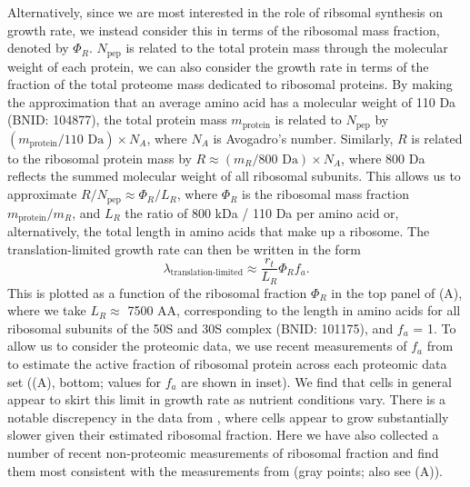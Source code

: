Alternatively, since we are most interested in the role of ribsomal synthesis on
growth rate, we instead consider this in terms of the ribosomal mass fraction, denoted by $\Phi_R$. $N_\text{pep}$ is related to the total protein mass
through the molecular weight of each protein, we can also consider the growth
rate in terms of the fraction of the total proteome mass dedicated to ribosomal
proteins. By making the approximation that an average amino acid has a molecular
weight of 110 Da (BNID: 104877), the total protein mass $m_\text{protein}$ is
related to $N_\text{pep}$ by $(m_\text{protein}/\text{110 Da}) \times N_A$,
where $N_A$ is Avogadro's number. Similarly, $R$ is related to the ribosomal
protein mass by $R \approx (m_R/\text{800 Da}) \times N_A$, where 800 Da
reflects the summed molecular weight of all ribosomal subunits.  This allows us
to approximate  $R / N_\text{pep} \approx \Phi_R / L_R$,  where $\Phi_R$ is the
ribosomal mass fraction $m_\text{protein}/m_R$, and $L_R$ the ratio of 800 kDa /
110 Da per amino acid or, alternatively, the total length in amino acids that
make up a ribosome. The translation-limited growth rate can then be written in
the form
\begin{equation}
\lambda_{\textrm{translation-limited}} \approx \frac{r_t}{L_R}  \Phi_R f_a.
\label{eq:translation_limit_growth_rate}
\end{equation}
This is plotted as a function of the ribosomal fraction $\Phi_R$ in the top panel of
(A), where we take $L_R \approx$ 7500 AA, corresponding to
the length in amino acids for all ribosomal subunits of the 50S and 30S complex
(BNID: 101175), and $f_a$ = 1. To allow us to consider the proteomic data,
we use recent measurements of $f_a$ from \cite{dai2016} to estimate the active
fraction of ribosomal protein across each proteomic data set
((A), bottom; values for $f_a$ are shown in inset). We find that cells in general appear to
skirt this limit in growth rate as nutrient conditions vary. There is a notable discrepency
in the data from \cite{peebo2015, valgepea2013}, where cells appear to grow
substantially slower given their estimated ribosomal fraction. Here we have
also collected a number of recent non-proteomic measurements of ribosomal fraction and
find them most consistent with the measurements from \cite{li2014,
schmidt2016} (gray points; also see (A)).


